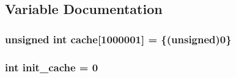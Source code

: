 \subsection{Variable Documentation}
\hypertarget{Collatz_8c_09_09_a117b8639e485388b199bd815b5490f1e}{
\subsubsection[{cache}]{\setlength{\rightskip}{0pt plus 5cm}unsigned int cache\mbox{[}1000001\mbox{]} = \{(unsigned)0\}}}\label{Collatz_8c_09_09_a117b8639e485388b199bd815b5490f1e}
\hypertarget{Collatz_8c_09_09_a4aec11a6e1b7cdca65df7232bfecb3de}{
\subsubsection[{init\-\_\-cache}]{\setlength{\rightskip}{0pt plus 5cm}int init\-\_\-cache = 0}}\label{Collatz_8c_09_09_a4aec11a6e1b7cdca65df7232bfecb3de}
